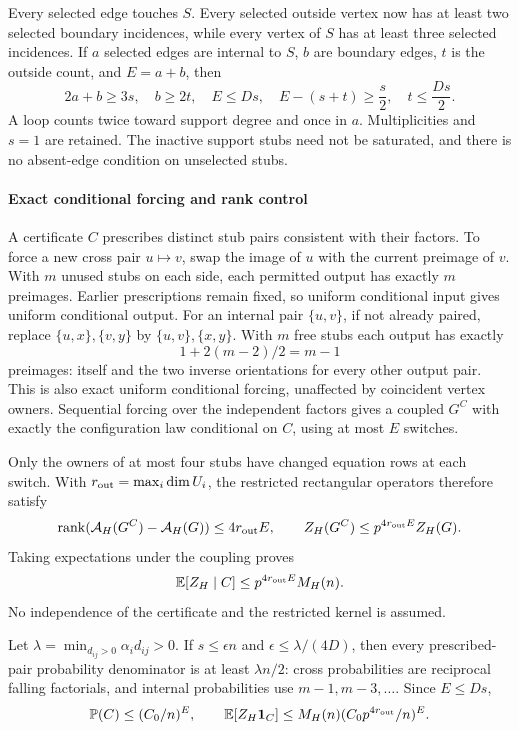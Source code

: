 Every selected edge touches $S$. Every selected outside vertex now has at least two selected boundary incidences, while every vertex of $S$ has at least three selected incidences. If $a$ selected edges are internal to $S$, $b$ are boundary edges, $t$ is the outside count, and $E=a+b$, then
\begin{equation}\label{ch:eq:excess}
 2a+b\ge3s,\quad b\ge2t,\quad E\le Ds,\quad
 E-(s+t)\ge\frac{s}{2},\quad t\le\frac{Ds}{2}.
\end{equation}
A loop counts twice toward support degree and once in $a$. Multiplicities and $s=1$ are retained. The inactive support stubs need not be saturated, and there is no absent-edge condition on unselected stubs.

\paragraph{Exact conditional forcing and rank control}
A certificate $C$ prescribes distinct stub pairs consistent with their factors. To force a new cross pair $u\mapsto v$, swap the image of $u$ with the current preimage of $v$. With $m$ unused stubs on each side, each permitted output has exactly $m$ preimages. Earlier prescriptions remain fixed, so uniform conditional input gives uniform conditional output. For an internal pair $\{u,v\}$, if not already paired, replace $\{u,x\},\{v,y\}$ by $\{u,v\},\{x,y\}$. With $m$ free stubs each output has exactly
\[
 1+2(m-2)/2=m-1
\]
preimages: itself and the two inverse orientations for every other output pair. This is also exact uniform conditional forcing, unaffected by coincident vertex owners. Sequential forcing over the independent factors gives a coupled $G^C$ with exactly the configuration law conditional on $C$, using at most $E$ switches.

Only the owners of at most four stubs have changed equation rows at each switch. With $r_{\rm out}=\max_i\dim U_i$, the restricted rectangular operators therefore satisfy
\[
 \operatorname{rank}(\mathcal A_H(G^C)-\mathcal A_H(G))\le4r_{\rm out}E,
 \qquad Z_H(G^C)\le p^{4r_{\rm out}E}Z_H(G).
\]
Taking expectations under the coupling proves
\begin{equation}\label{ch:eq:conditional}
 \mathbb E[Z_H\mid C]\le p^{4r_{\rm out}E}M_H(n).
\end{equation}
No independence of the certificate and the restricted kernel is assumed.

Let $\lambda=\min_{d_{ij}>0}\alpha_id_{ij}>0$. If $s\le\epsilon n$ and $\epsilon\le\lambda/(4D)$, then every prescribed-pair probability denominator is at least $\lambda n/2$: cross probabilities are reciprocal falling factorials, and internal probabilities use $m-1,m-3,\ldots$. Since $E\le Ds$,
\begin{equation}\label{ch:eq:weighted}
 \mathbb P(C)\le(C_0/n)^E,\qquad
 \mathbb E[Z_H\mathbf 1_C]\le M_H(n)(C_0p^{4r_{\rm out}}/n)^E.
\end{equation}

